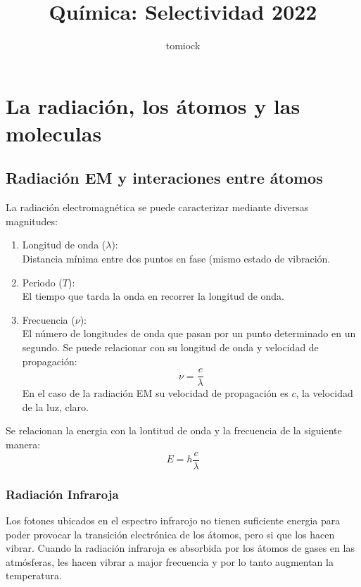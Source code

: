 \documentclass[arial,a4paper,print]{article}
\title{Química: Selectividad 2022}
\author{tomiock}
\begin{document}
	
	\maketitle
	
	\section{La radiación, los átomos y las moleculas}
	\subsection{Radiación EM y interaciones entre átomos}
	La radiación electromagnética se puede caracterizar mediante diversas magnitudes: 
	\begin{enumerate}
		\item Longitud de onda ($\lambda$): \\
		Distancia mínima entre dos puntos en fase (mismo estado de vibración. 
		\item Periodo ($T$): \\
		El tiempo que tarda la onda en recorrer la longitud de onda. 
		\item Frecuencia ($\nu$): \\
		El número de longitudes de onda que pasan por un punto determinado en un segundo. Se puede relacionar con su longitud de onda y velocidad de propagación: 
		\begin{equation*}
			\nu = \frac{c}{\lambda}
		\end{equation*}
		En el caso de la radiación EM su velocidad de propagación es $c$, la velocidad de la luz, claro. 
	\end{enumerate}
	
	Se relacionan la energia con la lontitud de onda y la frecuencia de la siguiente manera:
	\begin{equation*}
		E = h\frac{c}{\lambda} 
	\end{equation*}
	
	\subsubsection{Radiación Infraroja}
	Los fotones ubicados en el espectro infrarojo no tienen suficiente energia para poder provocar la transición electrónica de los átomos, pero si que los hacen vibrar. Cuando la radiación infraroja es absorbida por los átomos de gases en las atmósferas, les hacen vibrar a major frecuencia y por lo tanto augmentan la temperatura. 
	
\end{document}
